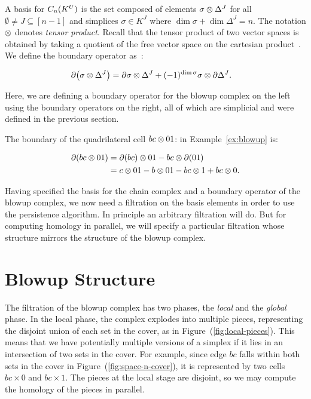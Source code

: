 A basis for $C_n(K^U)$ is the set composed of elements 
$\sigma \otimes \Delta^J$ for all $\emptyset \not = J \subseteq [n-1]$ and 
simplices $\sigma \in K^J$ where $\dim{\sigma} + \dim{\Delta^J} = n$.  The notation
$\otimes$ denotes \emph{tensor product}. Recall that the tensor product of two 
vector spaces is obtained by taking a quotient of the free vector space
on the cartesian product~\cite[\textrm{Page }218]{hatcher}.
We define the boundary operator as~\cite[\textrm{Lemma }4]{zc-lh-08}:
\begin{linenomath*}
\begin{align*}
\partial{\left (\sigma \otimes\Delta^J \right)}
&=
\partial{\sigma} \otimes \Delta^J + 
(-1)^{\dim{\sigma}}\sigma \otimes \partial\Delta^J.
\end{align*}
\end{linenomath*}
Here, we are defining a boundary operator for the blowup complex on the left 
using the boundary operators on the right, all of which are simplicial and were 
defined in the previous section. 
\begin{example}
The boundary of the quadrilateral cell 
$bc \otimes 01$: in Example~\ref{ex:blowup} is:
\begin{linenomath*}
\begin{align*}
\partial{\left (bc \otimes01 \right)}
&=
\partial{(bc)} \otimes 01 - bc \otimes \partial(01) \\
&= c \otimes 01 - b \otimes 01 - bc \otimes 1 + bc \otimes 0.
\end{align*}
\end{linenomath*}
\end{example}
Having specified the basis for the chain complex and a boundary operator of 
the blowup complex, we now need a filtration on the basis elements in order to use the 
persistence algorithm. In principle an arbitrary filtration will do.
But for computing homology in parallel, we will specify a particular filtration 
whose structure mirrors the structure of the blowup complex. 
\section{Blowup Structure}
\label{sec:blowup_structure}
The filtration of the blowup complex has two phases,  the \emph{local} and the
 \emph{global} phase. In the local phase, the complex explodes into multiple 
pieces, representing the disjoint union of each set in the cover, as in Figure~(\ref{fig:local-pieces}). 
This means that we have potentially multiple versions of a simplex 
if it lies in an intersection of two sets in the cover. For example, since edge $bc$ falls within both sets in the 
cover in Figure~(\ref{fig:space-n-cover}), it is represented by two cells 
$bc \times 0$ and $bc \times 1$. The pieces at the local stage are disjoint, so 
we may compute the homology of the pieces in parallel. 

